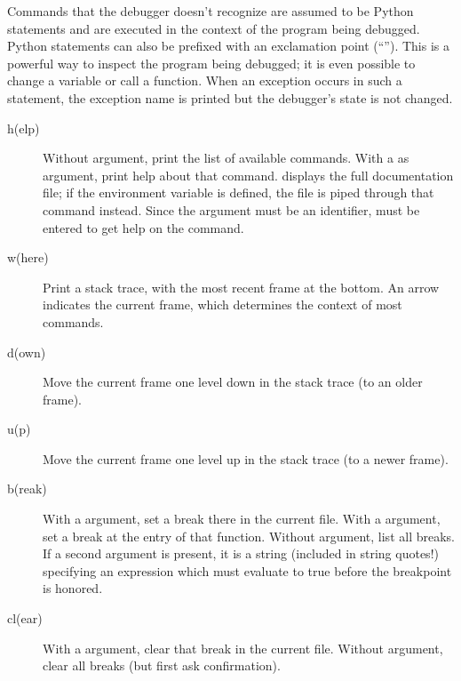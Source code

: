 Commands that the debugger doesn't recognize are assumed to be Python
statements and are executed in the context of the program being
debugged.  Python statements can also be prefixed with an exclamation
point (``\code{!}'').  This is a powerful way to inspect the program
being debugged; it is even possible to change a variable or call a
function.  When an
exception occurs in such a statement, the exception name is printed
but the debugger's state is not changed.

\begin{description}

\item[h(elp) ]

Without argument, print the list of available commands.  With a
 as argument, print help about that command.   displays the full documentation file; if the environment variable
 is defined, the file is piped through that command
instead.  Since the  argument must be an identifier,
 must be entered to get help on the \samp{!} command.

\item[w(here)]

Print a stack trace, with the most recent frame at the bottom.  An
arrow indicates the current frame, which determines the context of
most commands.

\item[d(own)]

Move the current frame one level down in the stack trace
(to an older frame).

\item[u(p)]

Move the current frame one level up in the stack trace
(to a newer frame).

\item[b(reak) ]

With a  argument, set a break there in the current
file.  With a  argument, set a break at the entry of
that function.  Without argument, list all breaks.
If a second argument is present, it is a string (included in string
quotes!) specifying an expression which must evaluate to true before
the breakpoint is honored.

\item[cl(ear) ]

With a  argument, clear that break in the current file.
Without argument, clear all breaks (but first ask confirmation).


\end{description}
